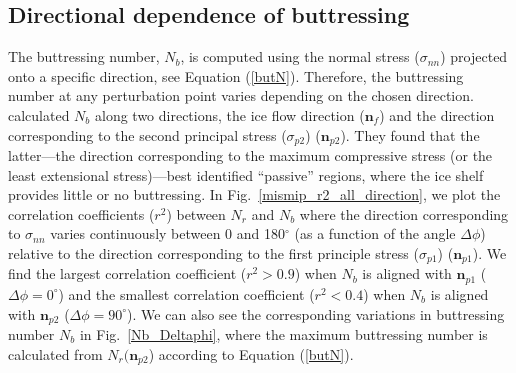 \documentclass[review,oneside]{igs}
\begin{document}
\subsection{Directional dependence of buttressing}

The buttressing number, $N_b$, is computed using the normal stress ($\sigma_{nn}$) projected onto a specific direction, see Equation (\ref{butN}). Therefore, the buttressing number at any perturbation point varies depending on the chosen direction. \citet{furst2016} calculated $N_b$ along two directions, the ice flow direction ($\mathbf{n}_f$) and the direction corresponding to the second principal stress ($\sigma_{p2}$) ($\mathbf{n}_{p2}$). They found that the latter---the direction corresponding to the maximum compressive stress (or the least extensional stress)---best identified ``passive'' regions, where the ice shelf provides little or no buttressing. In Fig.~\ref{mismip_r2_all_direction}, we plot the correlation coefficients ($r^2$) between $N_r$ and $N_b$ where the direction corresponding to $\sigma_{nn}$ varies continuously between 0 and 180$^\circ$ (as a function of the angle $\Delta \phi$) relative to the direction corresponding to the first principle stress ($\sigma_{p1}$) ($\mathbf{n}_{p1}$). We find the largest correlation coefficient ($r^2>0.9$) when $N_b$ is aligned with $\mathbf{n}_{p1}$ ($\Delta \phi=0^\circ$) and the smallest correlation coefficient ($r^2<0.4$) when $N_b$ is aligned with $\mathbf{n}_{p2}$ ($\Delta \phi=90^\circ$). We can also see the corresponding variations in buttressing number $N_b$ in Fig.~\ref{Nb_Deltaphi}, where the maximum buttressing number is calculated from $N_r(\mathbf{n}_{p2}$) according to Equation (\ref{butN}).
\end{document}
